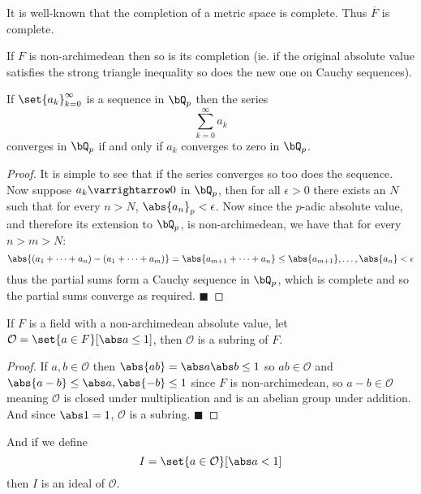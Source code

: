 \documentclass[10pt]{article}
\let\to=\varrightarrow
\def\qed{%
    \ifmmode%
        \eqno\blacksquare%
    \else%
        \hskip1cm\allowbreak\hbox{}\nobreak\hfill$\blacksquare$%
    \fi%
}
\def\mO{\mathcal O}
\begin{document}
It is well-known that the completion of a metric space is complete.
Thus $\overline F$ is complete.

If $F$ is non-archimedean then so is its completion (ie. if the original absolute value satisfies the strong triangle inequality so does the new one on Cauchy sequences).

\begin{prop*}

    If $\set{a_k}_{k=0}^\infty$ is a sequence in $\bQ_p$ then the series
    \[ \sum_{k=0}^\infty a_k \]
    converges in $\bQ_p$ if and only if $a_k$ converges to zero in $\bQ_p$.

\end{prop*}

\begin{proof}

    It is simple to see that if the series converges so too does the sequence.
    Now suppose $a_k\to0$ in $\bQ_p$, then for all $\epsilon>0$ there exists an $N$ such that for every $n>N$, $\abs{a_n}_p<\epsilon$.
    Now since the $p$-adic absolute value, and therefore its extension to $\bQ_p$, is non-archimedean, we have that for every $n>m>N$:
    \[ \abs{(a_1+\cdots+a_n) - (a_1+\cdots+a_m)} = \abs{a_{m+1}+\cdots+a_n} \leq \maxof{\abs{a_{m+1}},\dots,\abs{a_n}} < \epsilon \]
    thus the partial sums form a Cauchy sequence in $\bQ_p$, which is complete and so the partial sums converge as required.
    \qed

\end{proof}

\begin{prop*}

    If $F$ is a field with a non-archimedean absolute value, let $\mO=\set{a\in F}[\abs a\leq1]$, then $\mO$ is a subring of $F$.

\end{prop*}

\begin{proof}

    If $a,b\in\mO$ then $\abs{ab}=\abs a\abs b\leq1$ so $ab\in\mO$ and $\abs{a-b}\leq\maxof{\abs a,\abs{-b}}\leq1$ since $F$ is non-archimedean, so $a-b\in\mO$ meaning $\mO$ is closed under multiplication
    and is an abelian group under addition.
    And since $\abs1=1$, $\mO$ is a subring.
    \qed

\end{proof}

And if we define
\[ I = \set{a\in\mO}[\abs a<1] \]
then $I$ is an ideal of $\mO$.
\end{document}
